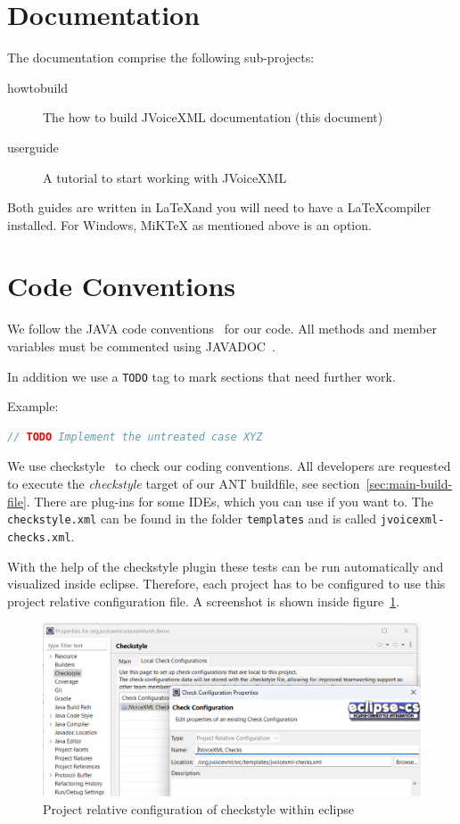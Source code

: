 \documentclass[11pt,a4paper]{article}
\begin{document}
\section{Documentation}

The documentation comprise the following sub-projects:

\begin{description}
\item[howtobuild] The how to build JVoiceXML documentation (this document)
\item[userguide] A tutorial to start working with JVoiceXML
\end{description}

Both guides are written in \LaTeX and you will need to have a \LaTeX compiler
installed. For Windows, MiKTeX as mentioned above is an option.


\section{Code Conventions}
\label{sec:code-conventions}

We follow the JAVA code conventions~\cite{sun:codeconv} for our code. All
methods and member variables must be commented using 
JAVADOC~\cite{sun:javadoc_guidelines}.

In addition we use a \texttt{TODO} tag to mark sections that need further work.

Example:

\begin{lstlisting}[language=Java]
// TODO Implement the untreated case XYZ
\end{lstlisting}

We use checkstyle~\cite{checkstyle} to check our coding conventions.
All developers are requested to execute the \emph{checkstyle} target
of our ANT buildfile, see section~\ref{sec:main-build-file}. 
There are plug-ins for some IDEs, which you can use if you want to. The
\texttt{checkstyle.xml} can be found in the folder 
\texttt{templates} and is called \texttt{jvoicexml-checks.xml}.

With the help of the checkstyle plugin these tests can be run automatically
and visualized inside eclipse. Therefore, each project has to be configured to
use this project relative configuration file. A screenshot is shown inside
figure~\ref{fig:eclipse-project-checkstyle}.
\begin{figure}
\includegraphics[width=\linewidth]{eclipse-project-checkstyle.png}
\caption{Project relative configuration of checkstyle within eclipse}
\label{fig:eclipse-project-checkstyle}
\end{figure}
\end{document}
